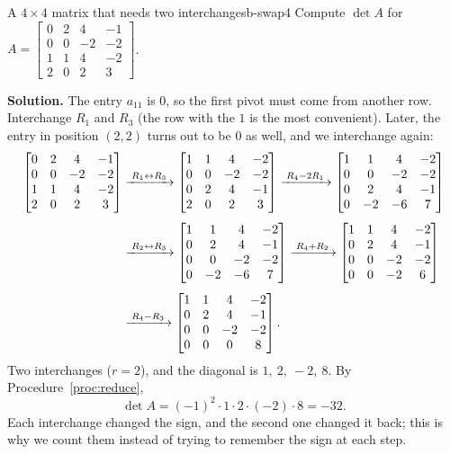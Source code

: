 \documentclass[11pt]{article}
\begin{document}
\begin{exmp}{A $4\times4$ matrix that needs two interchanges}{b-swap4}
Compute $\det A$ for $A=\begin{bmatrix}0&2&4&-1\\0&0&-2&-2\\1&1&4&-2\\2&0&2&3\end{bmatrix}$.

\textbf{Solution.} The entry $a_{11}$ is $0$, so the first pivot must come from another row. Interchange $R_1$ and $R_3$ (the row with the $1$ is the most convenient). Later, the entry in position $(2,2)$ turns out to be $0$ as well, and we interchange again:
\begin{align*}
\begin{bmatrix}0&2&4&-1\\0&0&-2&-2\\1&1&4&-2\\2&0&2&3\end{bmatrix}
&\xrightarrow{\;R_1\leftrightarrow R_3\;}
\begin{bmatrix}1&1&4&-2\\0&0&-2&-2\\0&2&4&-1\\2&0&2&3\end{bmatrix}
\xrightarrow{\;R_4-2R_1\;}
\begin{bmatrix}1&1&4&-2\\0&0&-2&-2\\0&2&4&-1\\0&-2&-6&7\end{bmatrix}
\\[4pt]
&\xrightarrow{\;R_2\leftrightarrow R_3\;}
\begin{bmatrix}1&1&4&-2\\0&2&4&-1\\0&0&-2&-2\\0&-2&-6&7\end{bmatrix}
\xrightarrow{\;R_4+R_2\;}
\begin{bmatrix}1&1&4&-2\\0&2&4&-1\\0&0&-2&-2\\0&0&-2&6\end{bmatrix}
\\[4pt]
&\xrightarrow{\;R_4-R_3\;}
\begin{bmatrix}1&1&4&-2\\0&2&4&-1\\0&0&-2&-2\\0&0&0&8\end{bmatrix}
.
\end{align*}
Two interchanges ($r=2$), and the diagonal is $1,\ 2,\ -2,\ 8$. By Procedure~\ref{proc:reduce},
\[
\det A=(-1)^2\cdot1\cdot2\cdot(-2)\cdot8=-32.
\]
Each interchange changed the sign, and the second one changed it back; this is why we count them instead of trying to remember the sign at each step.


\end{exmp}
\end{document}
